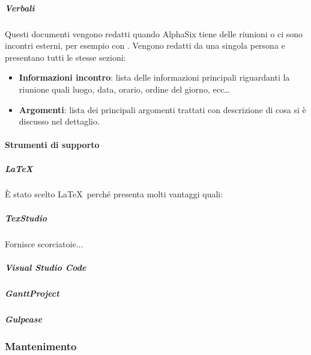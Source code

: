 			\subparagraph{Verbali}
			Questi documenti vengono redatti quando AlphaSix tiene delle riunioni o ci sono incontri esterni, per esempio con \II. Vengono redatti da una singola persona
			e presentano tutti le stesse sezioni:
			\begin{itemize}
				\item \textbf{Informazioni incontro}: lista delle informazioni principali riguardanti la riunione quali luogo, data, orario, ordine del giorno, ecc\dots
				\item \textbf{Argomenti}: lista dei principali argomenti trattati con descrizione di cosa si è discusso nel dettaglio.
			\end{itemize}


			\paragraph{Strumenti di supporto}

			\subparagraph{\LaTeX} \label{LaTeX}
			È stato scelto \LaTeX \ perché presenta molti vantaggi quali:

			\subparagraph{TexStudio}
			Fornisce scorciatoie...

			\subparagraph{Visual Studio Code}


			\subparagraph{GanttProject}


			\subparagraph{Gulpease}



		\subsubsection{Mantenimento}

